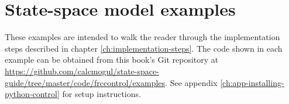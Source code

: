 
\chapter{State-space model examples}

These examples are intended to walk the reader through the implementation steps
described in chapter \ref{ch:implementation-steps}. The code shown in each
example can be obtained from this book's Git repository at
\url{https://github.com/calcmogul/state-space-guide/tree/master/code/frccontrol/examples}.
See appendix \ref{ch:app-installing-python-control} for setup instructions.







